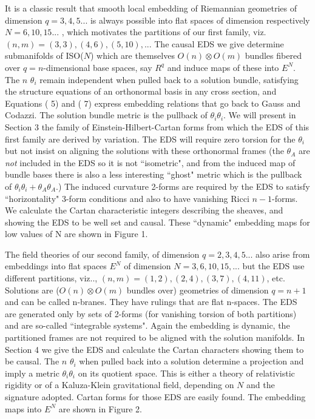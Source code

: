 \documentclass[a4paper,a4paper]{article}
\begin{document}
        It is a classic result \cite{gri87} that smooth local embedding
of Riemannian geometries of dimension $q = 3,  4,  5 ...$ is always
possible into flat spaces of dimension respectively $N =  6,  10,  15 ...$ ,
which motivates the partitions of our first family,  viz.  $(n, m) =  (3, 3),   (4, 6),
(5, 10), ...$ The causal EDS we give  determine submanifolds of ISO($N$) which
are themselves $O(n) \otimes O(m)$ bundles fibered over $q =
n$-dimensional base spaces,  say ${R^q}$ and induce maps of these into ${E^N}$. The $n$ 
${{\theta }_i}$  remain independent when pulled back to a solution
bundle,  satisfying the structure equations of an orthonormal basis in any cross
section,  and Equations ( 5) and ( 7) express embedding relations that
go back to Gauss and Codazzi. The solution bundle metric is the pullback
of ${{\theta }_i} {{\theta }_i}$.  We will present in Section 3 the
family of Einstein-Hilbert-Cartan forms from which the EDS of this first
family are derived by variation.  The EDS will require zero torsion for
the \({{\theta }_i}\) but  not insist on aligning the solutions with
these orthonormal frames (the \({{\theta }_A}\) are {\itshape not}
included in the EDS so it is not ``isometric",  and  from the induced map of
bundle bases there is also a less interesting ``ghost" metric which is
the pullback of ${{\theta }_i}{{\theta }_i}+{{\theta }_A}{{\theta }_A}$.)  The
induced curvature 2-forms are required by the EDS to satisfy
``horizontality" 3-form conditions and also to have vanishing Ricci $n-1$-forms.  We
calculate the Cartan characteristic integers describing the sheaves,
and showing the EDS to be well set and causal. These ``dynamic" embedding maps for low
values of N are shown in Figure  1.

        The field theories of our second family,  of dimension $q = 2,
3,  4,  5 ...$ also arise from embeddings into flat spaces  ${E^N}$ of
dimension $N = 3,  6,  10,  15,  ...$ but the EDS use different partitions,
viz..,  $(n, m) = (1, 2),  (2, 4),  (3, 7),  (4, 11)$,  etc.   Solutions
are ($O(n) \otimes O(m)$ bundles over) geometries  of dimension $q = n + 1$ 
and can be called n-branes.  They have rulings that are flat n-spaces.  The EDS
are generated only by sets of 2-forms (for vanishing torsion of both
partitions) and are so-called ``integrable systems".  Again
the embedding is dynamic,  the partitioned frames are not required to be aligned with
the solution manifolds.  In Section 4 we give the EDS and calculate the
Cartan characters showing them to be causal.   The  $n$ ${{\theta }_i}$ when
pulled back into a  solution determine a projection and  imply a metric
${{\theta }_i}{{\theta }_i}$ on its quotient space.  This is either  a theory of
relativistic rigidity or of a Kaluza-Klein gravitational field, depending
on $N$ and the signature adopted.   Cartan forms for those EDS are  easily
found.  The  embedding maps into ${E^N}$ are shown in Figure 2.
\end{document}

